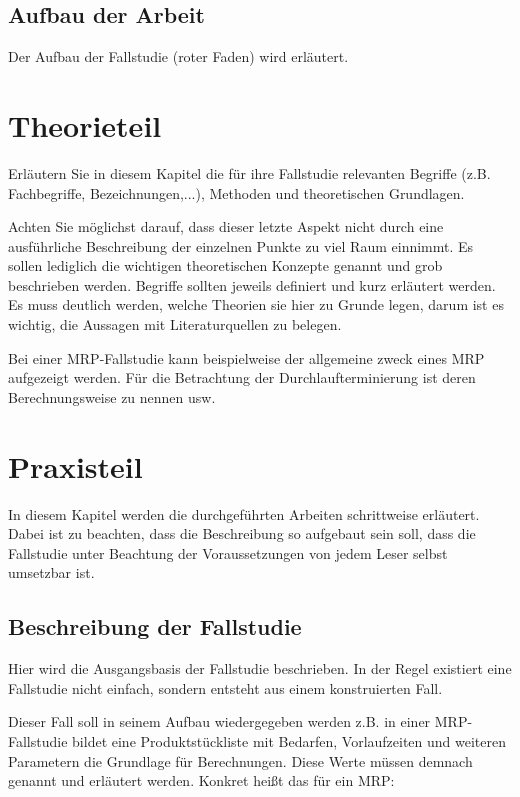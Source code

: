 \documentclass[12pt,a4paper, listof=entryprefix, bibliography=totocnumbered,toc=listofnumbered,lof=listofnumbered]{scrartcl}
\begin{document}
\subsection{Aufbau der Arbeit}
\label{ch:Aufbau}
Der Aufbau der Fallstudie (roter Faden) wird erläutert.

\pagebreak

\section{Theorieteil}
Erläutern Sie in diesem Kapitel die für ihre Fallstudie relevanten
Begriffe (z.B. Fachbegriffe, Bezeichnungen,...), Methoden und theoretischen Grundlagen.


Achten Sie möglichst darauf, dass dieser letzte Aspekt nicht durch eine ausführliche Beschreibung der einzelnen Punkte zu viel Raum einnimmt. Es sollen lediglich die wichtigen theoretischen Konzepte genannt und grob beschrieben werden.
Begriffe sollten jeweils definiert und kurz erläutert werden. Es muss deutlich werden, welche Theorien sie hier zu Grunde legen, darum ist es wichtig, die Aussagen mit Literaturquellen zu belegen.

Bei einer \gls{MRP}-Fallstudie kann beispielweise der allgemeine zweck eines \gls{MRP} aufgezeigt werden. Für die Betrachtung der Durchlaufterminierung ist deren Berechnungsweise zu nennen usw.

\pagebreak

\section{Praxisteil}
\label{ch:praxis}
In diesem Kapitel werden die durchgeführten Arbeiten schrittweise erläutert. Dabei ist zu beachten, dass die Beschreibung so aufgebaut sein soll, dass die Fallstudie unter Beachtung der Voraussetzungen von jedem Leser selbst umsetzbar ist.

\subsection{Beschreibung der Fallstudie}
\label{ch:beschreibung}
Hier wird die Ausgangsbasis der Fallstudie beschrieben. In der Regel existiert eine Fallstudie nicht einfach, sondern entsteht aus einem konstruierten Fall. 

Dieser Fall soll in seinem Aufbau wiedergegeben werden z.B. in einer \gls{MRP}-Fallstudie bildet eine Produktstückliste mit Bedarfen, Vorlaufzeiten und weiteren Parametern die Grundlage für Berechnungen. Diese Werte müssen demnach genannt und erläutert werden. Konkret heißt das für ein \gls{MRP}:
\end{document}
